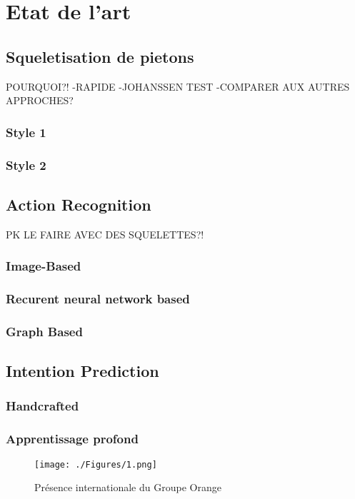 \section{Etat de l'art}
\label{sec:SOTA}

\subsection{Squeletisation de pietons}
POURQUOI?!
-RAPIDE
-JOHANSSEN TEST
-COMPARER AUX AUTRES APPROCHES?
\label{subsec:SQUEL}
\subsubsection{Style 1}
\subsubsection{Style 2}

\subsection{Action Recognition}
PK LE FAIRE AVEC DES SQUELETTES?!
\label{subsec:HAR}

\subsubsection{Image-Based}
\subsubsection{Recurent neural network based}
\subsubsection{Graph Based}

\subsection{Intention Prediction}
\subsubsection{Handcrafted}
\subsubsection{Apprentissage profond}





\begin{figure}[htbp]
    \texttt{[image: ./Figures/1.png]}
    \caption{Présence internationale du Groupe Orange}
    \label{fig:UoC}
\end{figure}


